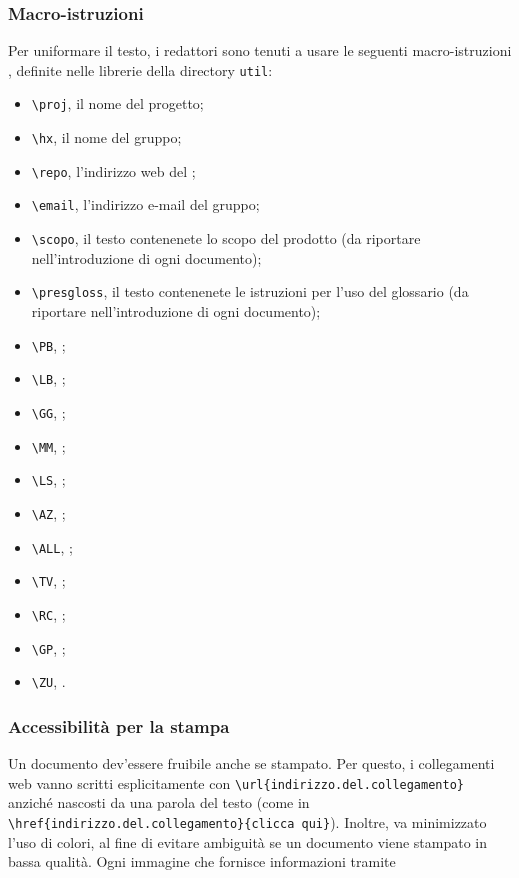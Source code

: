 \subsubsection{Macro-istruzioni }
Per uniformare il testo, i redattori sono tenuti a usare le seguenti macro-istruzioni , definite nelle librerie della directory \texttt{util}:
\begin{itemize}
	\item \texttt{\textbackslash proj}, il nome del progetto;
	\item \texttt{\textbackslash hx}, il nome del gruppo;
	\item \texttt{\textbackslash repo}, l'indirizzo web del ;
	\item \texttt{\textbackslash email}, l'indirizzo e-mail del gruppo;
	\item \texttt{\textbackslash scopo}, il testo contenenete lo scopo del prodotto (da riportare nell'introduzione di ogni documento);
	\item \texttt{\textbackslash presgloss}, il testo contenenete le istruzioni per l'uso del glossario (da riportare nell'introduzione di ogni documento);
	\item \texttt{\textbackslash PB}, \PB;
	\item \texttt{\textbackslash LB}, \LB;
	\item \texttt{\textbackslash GG}, \GG;
	\item \texttt{\textbackslash MM}, \MM;
	\item \texttt{\textbackslash LS}, \LS;
	\item \texttt{\textbackslash AZ}, \AZ;
	\item \texttt{\textbackslash ALL}, \ALL;
	\item \texttt{\textbackslash TV}, \TV;
	\item \texttt{\textbackslash RC}, \RC;
	\item \texttt{\textbackslash GP}, \GP;
	\item \texttt{\textbackslash ZU}, \ZU.
\end{itemize}

\subsubsection{Accessibilità per la stampa} Un documento dev'essere fruibile anche se stampato. Per questo, i collegamenti web vanno scritti esplicitamente con \texttt{\textbackslash url\{indirizzo.del.collegamento\}} anziché nascosti da una parola del testo (come in \texttt{\textbackslash href\{indirizzo.del.collegamento\}\{clicca qui\}}). Inoltre, va minimizzato l'uso di colori, al fine di evitare ambiguità se un documento viene stampato in bassa qualità. Ogni immagine che fornisce informazioni tramite 



